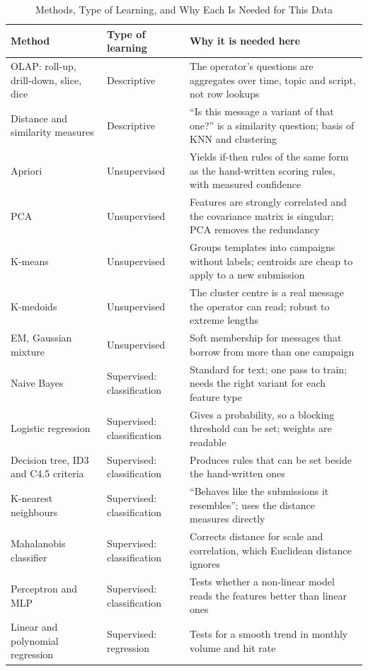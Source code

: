 \documentclass[conference]{IEEEtran}
\begin{document}
\begin{table}[t]
\caption{Methods, Type of Learning, and Why Each Is Needed for This Data}
\label{tab:learning}
\centering
\begin{tabular}{@{}p{3.9cm}p{3.5cm}p{9.3cm}@{}}
\toprule
\textbf{Method} & \textbf{Type of learning} & \textbf{Why it is needed here} \\
\midrule
OLAP: roll-up, drill-down, slice, dice \cite{chaudhuri1997} & Descriptive & The operator's questions are aggregates over time, topic and script, not row lookups \\
Distance and similarity measures & Descriptive & ``Is this message a variant of that one?'' is a similarity question; basis of KNN and clustering \\
Apriori \cite{agrawal1994} & Unsupervised & Yields if-then rules of the same form as the hand-written scoring rules, with measured confidence \\
PCA \cite{jolliffe2002} & Unsupervised & Features are strongly correlated and the covariance matrix is singular; PCA removes the redundancy \\
K-means \cite{macqueen1967} & Unsupervised & Groups templates into campaigns without labels; centroids are cheap to apply to a new submission \\
K-medoids \cite{kaufman1990} & Unsupervised & The cluster centre is a real message the operator can read; robust to extreme lengths \\
EM, Gaussian mixture \cite{dempster1977} & Unsupervised & Soft membership for messages that borrow from more than one campaign \\
Naive Bayes \cite{sahami1998,metsis2006} & Supervised: classification & Standard for text; one pass to train; needs the right variant for each feature type \\
Logistic regression & Supervised: classification & Gives a probability, so a blocking threshold can be set; weights are readable \\
Decision tree, ID3 and C4.5 criteria \cite{quinlan1986,quinlan1993} & Supervised: classification & Produces rules that can be set beside the hand-written ones \\
K-nearest neighbours \cite{cover1967} & Supervised: classification & ``Behaves like the submissions it resembles''; uses the distance measures directly \\
Mahalanobis classifier \cite{mahalanobis1936} & Supervised: classification & Corrects distance for scale and correlation, which Euclidean distance ignores \\
Perceptron and MLP \cite{rosenblatt1958} & Supervised: classification & Tests whether a non-linear model reads the features better than linear ones \\
Linear and polynomial regression & Supervised: regression & Tests for a smooth trend in monthly volume and hit rate \\
\bottomrule
\end{tabular}
\end{table}
\end{document}
